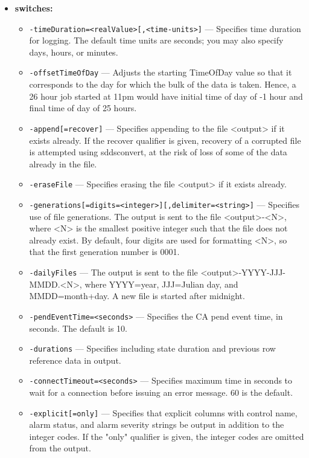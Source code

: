 \begin{itemize}
%
\item {\bf switches:}
%
%
    \begin{itemize}
%
%
        \item {\tt -timeDuration=<realValue>[,<time-units>]} --- Specifies time duration for logging.  The default time units are seconds; you may also specify days, hours, or minutes.
        \item {\tt -offsetTimeOfDay} --- Adjusts the starting TimeOfDay value so that it corresponds to the day for which the bulk of the data is taken.  Hence, a 26 hour job started at 11pm would have initial time of day of -1 hour and final time of day of 25 hours.
        \item {\tt -append[=recover]} --- Specifies appending to the file <output> if it exists already. If the recover qualifier is given, recovery of a corrupted file is attempted using sddsconvert, at the risk of loss of some of the data already in the file.
        \item {\tt -eraseFile} --- Specifies erasing the file <output> if it exists already.
        \item {\tt -generations[=digits=<integer>][,delimiter=<string>]} --- Specifies use of file generations.  The output is sent to the file <output>-<N>, where <N> is the smallest positive integer such that the file does not already exist.   By default, four digits are used for formatting <N>, so that the first generation number is 0001.
        \item {\tt -dailyFiles} --- The output is sent to the file <output>-YYYY-JJJ-MMDD.<N>, where YYYY=year, JJJ=Julian day, and MMDD=month+day.  A new file is started after midnight.
        \item {\tt -pendEventTime=<seconds>} --- Specifies the CA pend event time, in seconds.  The default is 10.
        \item {\tt -durations} --- Specifies including state duration and previous row reference data in output.
        \item {\tt -connectTimeout=<seconds>} --- Specifies maximum time in seconds to wait for a connection before issuing an error message. 60 is the default.
        \item {\tt -explicit[=only]} --- Specifies that explicit columns with control name, alarm status, and alarm severity strings be output in addition to the integer codes.  If the "only" qualifier is given, the integer codes are omitted from the output.

\end{itemize}
\end{itemize}
